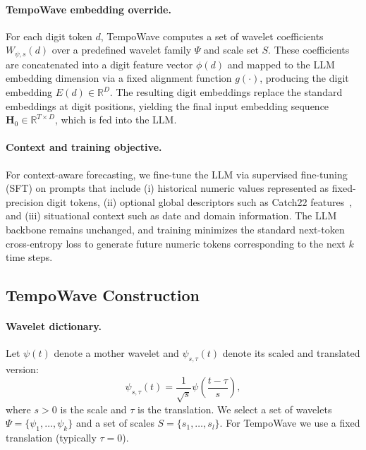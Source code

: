 \documentclass{article}
\begin{document}
\paragraph{TempoWave embedding override.}
For each digit token $d$, TempoWave computes a set of wavelet coefficients $W_{\psi,s}(d)$ over a predefined wavelet family $\Psi$ and scale set $S$.
These coefficients are concatenated into a digit feature vector $\phi(d)$ and mapped to the LLM embedding dimension via a fixed alignment function $g(\cdot)$, producing the digit embedding $E(d)\in\mathbb{R}^{D}$.
The resulting digit embeddings replace the standard embeddings at digit positions, yielding the final input embedding sequence
$\mathbf{H}_0 \in \mathbb{R}^{T \times D}$, which is fed into the LLM.

\paragraph{Context and training objective.}
For context-aware forecasting, we fine-tune the LLM via supervised fine-tuning (SFT) on prompts that include
(i) historical numeric values represented as fixed-precision digit tokens,
(ii) optional global descriptors such as Catch22 features~\cite{lubba2019catch22}, and
(iii) situational context such as date and domain information.
The LLM backbone remains unchanged, and training minimizes the standard next-token cross-entropy loss to generate future numeric tokens corresponding to the next $k$ time steps.

\subsection{TempoWave Construction}
\label{sec:TempoWave}

\paragraph{Wavelet dictionary.}
Let $\psi(t)$ denote a mother wavelet and $\psi_{s,\tau}(t)$ denote its scaled and translated version:
\begin{equation}
\psi_{s,\tau}(t) = \frac{1}{\sqrt{s}}\psi\left(\frac{t-\tau}{s}\right),
\label{eq:wavelet_scale_translate_main}
\end{equation}
where $s>0$ is the scale and $\tau$ is the translation. We select a set of wavelets $\Psi=\{\psi_1,\ldots,\psi_k\}$ and a set of scales $S=\{s_1,\ldots,s_l\}$. For TempoWave we use a fixed translation (typically $\tau=0$). 
\end{document}

